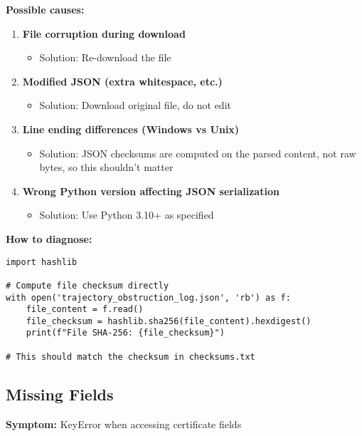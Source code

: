 \documentclass[11pt,a4paper]{article}
\theoremstyle{definition}
\begin{document}
\textbf{Possible causes:}
\begin{enumerate}
    \item \textbf{File corruption during download}
    \begin{itemize}
        \item Solution: Re-download the file
    \end{itemize}
    
    \item \textbf{Modified JSON (extra whitespace, etc.)}
    \begin{itemize}
        \item Solution: Download original file, do not edit
    \end{itemize}
    
    \item \textbf{Line ending differences (Windows vs Unix)}
    \begin{itemize}
        \item Solution: JSON checksums are computed on the parsed content, not raw bytes, so this shouldn't matter
    \end{itemize}
    
    \item \textbf{Wrong Python version affecting JSON serialization}
    \begin{itemize}
        \item Solution: Use Python 3.10+ as specified
    \end{itemize}
\end{enumerate}

\textbf{How to diagnose:}

\begin{lstlisting}[style=pythonstyle]
import hashlib

# Compute file checksum directly
with open('trajectory_obstruction_log.json', 'rb') as f:
    file_content = f.read()
    file_checksum = hashlib.sha256(file_content).hexdigest()
    print(f"File SHA-256: {file_checksum}")

# This should match the checksum in checksums.txt
\end{lstlisting}

\subsection{Missing Fields}

\textbf{Symptom:} KeyError when accessing certificate fields
\end{document}
